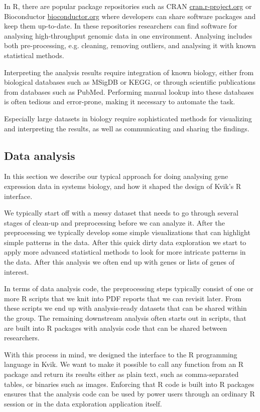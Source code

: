 In R, there are popular package repositories such as CRAN
\url{cran.r-project.org} or Bioconductor \url{bioconductor.org} where developers
can share software packages and keep them up-to-date. In these repositories
researchers can find software for analysing high-throughput genomic data in one
environment. Analysing includes both pre-processing, e.g. cleaning, removing
outliers, and analysing it with known statistical methods.

Interpreting the analysis results require integration of known biology, either
from biological databases such as MSigDB\cite{} or KEGG\cite{}, or through
scientific publications from databases such as PubMed\cite{}. Performing manual
lookup into these databases is often tedious and error-prone, making it
necessary to automate the task. %

Especially large datasets in biology require sophisticated methods for
visualizing and interpreting the results, as well as communicating and sharing
the findings.

\subsection*{Data analysis} 
In this section we describe our typical approach for doing analysing gene
expression data in systems biology, and how it shaped the design of Kvik's
R interface. 

We typically start off with a messy dataset that needs to go through
several stages of clean-up and preprocessing before we can analyze it. After the
preprocessing we typically develop some simple visualizations that can highlight
simple patterns in the data. After this quick dirty data exploration we start to
apply more advanced statistical methods to look for more intricate patterns in
the data.  After this analysis we often end up with genes or lists of genes of
interest. 

In terms of data analysis code, the preprocessing steps typically consist of
one or more R scripts that we knit \cite{knitr} into PDF reports that we can
revisit later. From these scripts we end up with analysis-ready datasets that
can be shared within the group. The remaining downstream analysis often starts
out in scripts, that are built into R packages with analysis code that can be
shared between researchers. 

With this process in mind, we designed the interface to the R programming
language in Kvik. We want to make it possible to call any function from an R
package and return its results either as plain text, such as comma-separated
tables, or binaries such as images. Enforcing that R code is built into R
packages ensures that the analysis code can be used by power users through an
ordinary R session or in the data exploration application itself. 



